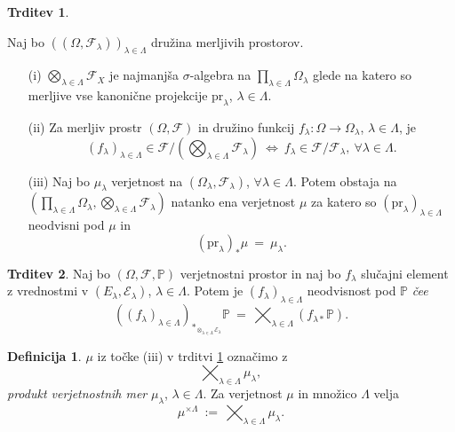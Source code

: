 \documentclass[11pt]{article}
\renewcommand{\P}{\mathbb{P}}
\newcommand{\F}{\mathcal{F}}
\newcommand{\EE}{\mathcal{E}}
\newcommand{\oklepaj}[1]{\left(#1\right)}
\newcommand{\1}{\mathbbm{1}}
\newcommand{\pr}{\text{pr}}
\theoremstyle{definition}
\newtheorem{definicija}{Definicija}[section]
\theoremstyle{definition}
\newtheorem{trditev}{Trditev}[section]
\theoremstyle{definition}
\theoremstyle{definition}
\begin{document}
\begin{trditev}\label{ref:3.7}

Naj bo $\oklepaj{(\Omega, \F_\lambda)}_{\lambda\in\Lambda}$ družina merljivih prostorov.
\begin{itemize}

\item[(i)] $\bigotimes_{\lambda\in\Lambda} \F_X$ je najmanjša $\sigma$-algebra na $\prod_{\lambda\in\Lambda} \Omega_\lambda$ glede na katero so merljive vse kanonične projekcije $\pr_\lambda$, $\lambda\in\Lambda$.

\item[(ii)] Za merljiv prostr $(\Omega, \F)$ in družino funkcij $f_\lambda: \Omega \rightarrow \Omega_\lambda$, $\lambda\in\Lambda$, je
$$(f_\lambda)_{\lambda\in\Lambda} \in \F/(\bigotimes_{\lambda\in\Lambda} \F_\lambda) ~\iff~ f_\lambda \in \F/\F_\lambda, ~ \forall \lambda \in \Lambda.$$

\item[(iii)] Naj bo $\mu_\lambda$ verjetnost na $(\Omega_\lambda, \F_\lambda)$, $\forall \lambda \in \Lambda$. Potem obstaja na $\oklepaj{\prod_{\lambda\in\Lambda}\Omega_\lambda, \bigotimes_{\lambda\in\Lambda} \F_\lambda}$ natanko ena verjetnost $\mu$ za katero so $(\pr_\lambda)_{\lambda\in\Lambda}$ neodvisni pod $\mu$ in
$$(\pr_\lambda)_*\mu ~=~ \mu_\lambda.$$

\end{itemize}

\end{trditev}
\vspace{0.5cm}

\begin{trditev}

Naj bo $(\Omega, \F, \P)$ verjetnostni prostor in naj bo $f_\lambda$ slučajni element z vrednostmi v $(E_\lambda, \EE_\lambda)$, $\lambda\in\Lambda$. Potem je $(f_\lambda)_{\lambda\in\Lambda}$ neodvisnost pod $\P$ \textit{čee}
$$\oklepaj{(f_\lambda)_{\lambda\in\Lambda}}_{*_{\otimes_{\lambda\in\Lambda}\EE_\lambda}}\P ~=~ \bigtimes_{\lambda\in\Lambda} ({f_{\lambda*}} \P).$$

\end{trditev}
\vspace{0.5cm}

\begin{definicija}

$\mu$ iz točke (iii) v trditvi \ref{ref:3.7} označimo z 
$$\bigtimes_{\lambda\in\Lambda} \mu_\lambda,$$
\textit{produkt verjetnostnih mer} $\mu_\lambda$, $\lambda\in\Lambda$. Za verjetnost $\mu$ in množico $\Lambda$ velja
$$\mu^{\times\Lambda} ~:=~ \bigtimes_{\lambda\in\Lambda} \mu_\lambda.$$

\end{definicija}
\vspace{0.5cm}


\pagebreak

\end{document}
